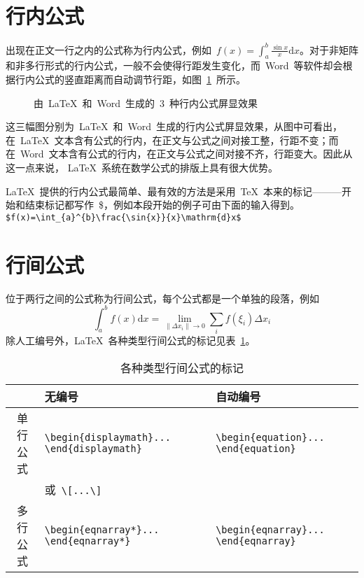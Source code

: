 \section{行内公式}
出现在正文一行之内的公式称为行内公式，例如~$f(x)=\int_{a}^{b}\frac{\sin{x}}{x}\mathrm{d}x$。对于非矩阵和非多行形式的行内公式，一般不会使得行距发生变化，而~Word~等软件却会根据行内公式的竖直距离而自动调节行距，如图~\ref{fig:hangju}~所示。

\begin{figure}[htbp]
\centering
{}

\caption{由~\LaTeX~和~Word~生成的~3~种行内公式屏显效果}\label{fig:hangju}
\vspace{-1em}
\end{figure}

这三幅图分别为~\LaTeX~和~Word~生成的行内公式屏显效果，从图中可看出，在~\LaTeX~文本含有公式的行内，在正文与公式之间对接工整，行距不变；而在~Word~文本含有公式的行内，在正文与公式之间对接不齐，行距变大。因此从这一点来说，
\LaTeX~系统在数学公式的排版上具有很大优势。

\LaTeX~提供的行内公式最简单、最有效的方法是采用~\TeX~本来的标记———开始和结束标记都写作~\$，例如本段开始的例子可由下面的输入得到。
\verb|$f(x)=\int_{a}^{b}\frac{\sin{x}}{x}\mathrm{d}x$|

\section{行间公式}
位于两行之间的公式称为行间公式，每个公式都是一个单独的段落，例如
\[\int_a^b{f\left(x\right)\mathrm{d}x}=\lim_{\left\|\Delta{x_i}\right\|\to 0}\sum_i{f\left(\xi_i\right)\Delta{x_i}}\]
除人工编号外，\LaTeX~各种类型行间公式的标记见表~\ref{tab:eqtag}。
\begin{table}[htbp]
\caption{各种类型行间公式的标记}\label{tab:eqtag}
\vspace{0.5em}\centering\wuhao
\begin{tabularx}{\textwidth}{cll}
\toprule
& 无编号 & 自动编号\\
\midrule
单行公式& \verb|\begin{displaymath}... \end{displaymath}|& \verb|\begin{equation}... \end{equation}|\\
        & 或~\verb|\[...\]| & \\
多行公式& \verb|\begin{eqnarray*}... \end{eqnarray*}|& \verb|\begin{eqnarray}... \end{eqnarray}|\\
\bottomrule
\end{tabularx}
\end{table}

